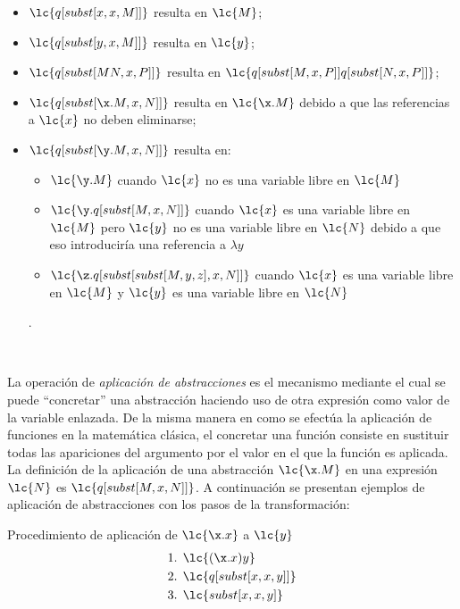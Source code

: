 \begin{itemize}
\item \(\lc{q[subst[x,x,M]]}\) resulta en \(\lc{M}\);
\item \(\lc{q[subst[y,x,M]]}\) resulta en \(\lc{y}\);
\item \(\lc{q[subst[M N, x, P]]}\) resulta en \(\lc{q[subst[M, x, P]] q[subst[N,
    x, P]]}\);
\item \(\lc{q[subst[\x.M, x, N]]}\) resulta en \(\lc{\x.M}\) debido a que las
  referencias a \(\lc{x}\) no deben eliminarse;
\item \(\lc{q[subst[\y.M, x, N]]}\) resulta en:
  \begin{itemize}
  \item \(\lc{\y.M}\) cuando \(\lc{x}\) no es una variable libre en \(\lc{M}\)
  \item \(\lc{\y.q[subst[M, x, N]]}\) cuando \(\lc{x}\) es una variable libre en
    \(\lc{M}\) pero \(\lc{y}\) no es una variable libre en \(\lc{N}\) debido a que
    eso introduciría una referencia a \(\lambda y\)
  \item \(\lc{\z.q[subst[subst[M,y,z],x,N]]}\) cuando \(\lc{x}\) es una variable
    libre en \(\lc{M}\) y \(\lc{y}\) es una variable libre en \(\lc{N}\)
  \end{itemize}.
\end{itemize} \

La operación de \emph{aplicación de abstracciones} es el mecanismo mediante el cual
se puede ``concretar'' una abstracción haciendo uso de otra expresión como valor
de la variable  enlazada. De la misma manera en como se efectúa la
aplicación de funciones en la matemática clásica, el concretar una función
consiste en sustituir todas las apariciones del argumento por el valor en el que
la función es aplicada. \\

La definición de la aplicación de una abstracción \(\lc{\x.M}\) en una expresión
\(\lc{N}\) es \(\lc{q[subst[M,x,N]]}\). A continuación se presentan ejemplos de
aplicación de abstracciones con los pasos de la transformación: \\

\begin{ejemplo} Procedimiento de aplicación de \(\lc{\x.x}\) a \(\lc{y}\)
  \label{ejemplo:aplicacion3}
  \begin{align*}
    \text{1. } &\lc{(\x.x)y} \\
    \text{2. } &\lc{q[subst[x,x,y]]} \\
    \text{3. } &\lc{subst[x,x,y]}
  \end{align*}
\end{ejemplo} \

